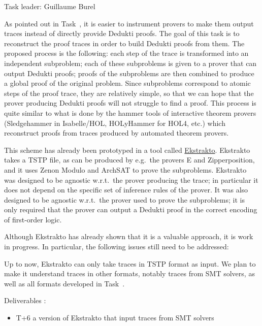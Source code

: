 \begin{workpackage}[id=atpetc,wphases=0-48,type=RTD,
  short=ATPs etc.,%
  title={ATP, SAT, SMT, Model checkers},
  lead=Lie,
  LieRM=10]
\begin{tasklist}
\begin{task}[id=instrumenting, title=Instrumenting ATPs to produce
  traces]
\end{task}


\begin{task}[id=tracetodedukti, title=Translate ATP traces into Dedukti]
  Task leader: Guillaume Burel

As pointed out in Task~, it is easier to
instrument provers to make them output traces instead of directly
provide Dedukti proofs. The goal of this task is to reconstruct the
proof traces in order to build Dedukti proofs from them. The proposed
process is the following: each step of the trace is transformed into
an independent subproblem; each of these subproblems is given to a
prover that can output Dedukti proofs; proofs of the subproblems are
then combined to produce a global proof of the original problem. Since
subproblems correspond to atomic steps of the proof trace, they are
relatively simple, so that we can hope that the prover producing
Dedukti proofs will not struggle to find a proof. This process is
quite similar to what is done by the hammer tools of interactive
theorem provers (Sledgehammer in Isabelle/HOL, HOLyHammer for HOL4, etc.)
which reconstruct proofs from traces produced by automated theorem
provers.

This scheme has already been prototyped in a tool called
\href{https://github.com/Deducteam/ekstrakto}{Ekstrakto}. Ekstrakto takes a TSTP
file, as can be produced by e.g.\ the provers E and Zipperposition, and it uses
Zenon Modulo and ArchSAT to prove the subproblems. Ekstrakto was designed to be
agnostic w.r.t.\ the prover producing the trace; in particular it does not
depend on the specific set of inference rules of the prover. It was also
designed to be agnostic w.r.t.\ the prover used to prove the subproblems; it is
only required that the prover can output a Dedukti proof in the correct encoding
of first-order logic.

Although Ekstrakto has already shown that it is a
valuable approach, it is work in progress. In particular, the
following issues still need to be addressed:

\begin{compactenum}
\item Up to now, Ekstrakto can only take traces in TSTP format as input. We plan
  to make it understand traces in other formats, notably traces from SMT
  solvers, as well as all formats developed in
  Task~.

  Deliverables :
  \begin{itemize}
  \item T+6 a version of Ekstrakto that input traces from SMT solvers
  \end{itemize}



\end{compactenum}
\end{task}
\end{tasklist}
\end{workpackage}

